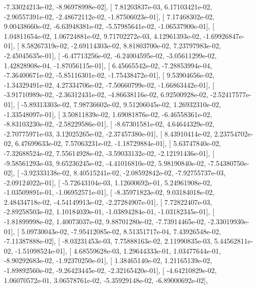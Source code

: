 \documentclass{article}
\begin{document}
         -7.33024213e-02,  -8.96978998e-02],
       [  7.81203837e-03,   6.17103421e-02,  -2.90557391e-02,
         -2.48672112e-02,  -1.87506023e-01],
       [  7.17468302e-02,   9.00438660e-02,  -6.63948381e-02,
         -5.57985641e-02,  -1.06537900e-01],
       [  1.04811654e-02,   1.06724881e-02,   9.71702272e-03,
          4.12961393e-02,  -1.69926847e-01],
       [  8.58267319e-02,  -2.69114303e-02,   8.81803700e-02,
          7.23797983e-02,  -2.45045635e-01],
       [ -6.47713256e-02,  -6.24004595e-02,  -3.05611299e-02,
          1.42828908e-04,  -1.87056115e-01],
       [  6.45665542e-02,  -7.28853994e-04,  -7.36400671e-02,
         -5.85116301e-02,  -1.75438472e-01],
       [  9.53904656e-02,  -1.34329491e-02,   4.27334706e-02,
         -7.50660799e-02,  -1.66863442e-01],
       [ -3.91710989e-02,  -2.36312431e-02,  -4.86638116e-02,
          6.92500928e-02,  -2.52417577e-01],
       [ -5.89313303e-02,   7.98736602e-02,   9.51206045e-02,
          1.26932310e-02,  -1.33548097e-01],
       [  3.50811839e-02,   1.69081876e-02,  -6.46558361e-02,
         -8.83103230e-02,  -2.58229586e-01],
       [ -8.67301581e-02,   4.64644329e-02,  -2.70775971e-03,
          3.12025265e-02,  -2.37457380e-01],
       [  8.43910414e-02,   2.23754702e-02,   6.47699633e-02,
          7.57063231e-02,  -1.18729884e-01],
       [  5.63747840e-02,  -7.32688524e-02,   7.55614928e-02,
         -3.59033132e-02,  -2.12191436e-01],
       [ -9.58561293e-03,   9.65236245e-02,  -4.41016810e-02,
          5.98190840e-02,  -7.54380750e-02],
       [ -3.92333138e-02,   8.40515241e-02,  -2.08592842e-02,
         -7.92755737e-03,  -2.09124022e-01],
       [ -5.72643104e-03,   1.12600692e-01,   5.24961908e-02,
         -1.03509891e-01,  -1.06952571e-01],
       [ -8.35971823e-02,   9.03184018e-02,   2.48434718e-02,
         -4.54149913e-02,  -2.27284907e-01],
       [  7.72822407e-03,  -2.89258503e-02,   1.10184039e-01,
         -1.03894284e-01,  -1.03182345e-01],
       [ -1.81899998e-02,   1.40073037e-02,   9.88701280e-02,
         -7.73914465e-02,  -2.33019930e-01],
       [  5.09730043e-02,  -7.95412085e-02,   8.51351717e-04,
          7.43926548e-02,  -7.11387888e-02],
       [ -8.03231453e-03,   7.75888163e-02,   2.11990835e-03,
          5.44562811e-02,  -1.51098524e-01],
       [  4.68559628e-03,   1.29644333e-01,   1.03477644e-01,
         -8.90292683e-02,  -1.92370250e-01],
       [  1.38465140e-02,   1.21165139e-02,  -1.89892560e-02,
         -9.26423445e-02,  -2.32165420e-01],
       [ -4.64210829e-02,   1.06070572e-01,   3.06578761e-02,
         -5.35929148e-02,  -6.89000692e-02],
\end{document}
